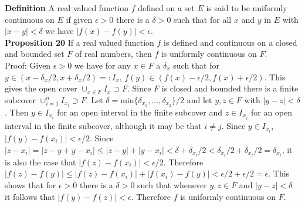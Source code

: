\documentclass[a4paper]{article}
\begin{document}
{\bf Definition} A real valued function $f$ defined on a set $E$ is said to be uniformly continuous on $E$ if given $\epsilon > 0$ there is a $\delta > 0$ such that for all $x$ and $y$ in $E$ with $|x-y| < \delta$ we have $|f(x) - f(y)| < \epsilon$. \\

{\bf Proposition 20} If a real valued function $f$ is defined and continuous on a closed and bounded set $F$ of real numbers, then $f$ is uniformly continuous on $F$. \\

Proof: Given $\epsilon > 0$ we have for any $x \in F$ a $\delta_x$ such that for $y \in (x-\delta_x/2,x+\delta_x/2) =: I_x$, $f(y) \in (f(x) - \epsilon/2, f(x) + \epsilon/2)$. This gives the open cover $\cup_{x \in F} I_x \supset F$. Since $F$ is closed and bounded there is a finite subcover $\cup_{i=1}^n I_{x_i} \supset F$. Let $\delta = \text{min}\{\delta_{x_1}, ..., \delta_{x_2}\} / 2$ and let $y,z \in F$ with $|y-z| < \delta$. Then $y \in I_{x_i}$ for an open interval in the finite subcover and $z \in I_{x_j}$ for an open interval in the finite subcover, although it may be that $i \neq j$. Since $y \in I_{x_i}$, $|f(y) - f(x_i)| < \epsilon/2$. Since $|z-x_i| = |z - y + y - x_i| \leq |z-y| +|y-x_i| < \delta + \delta_{x_i}/2< \delta_{x_i}/2 + \delta_{x_i}/2 = \delta_{x_i}$, it is also the case that $|f(z) - f(x_i)| < \epsilon/2$. Therefore $|f(z) - f(y)| \leq |f(z) - f(x_i)| + |f(x_i) - f(y)| < \epsilon/2 + \epsilon/2 = \epsilon$. This shows that for $\epsilon > 0$ there is a $\delta>0$ such that whenever $y,z \in F$ and $|y-z| < \delta$ it follows that $|f(y) - f(z)| < \epsilon$. Therefore $f$ is uniformly continuous on $F$. \\
\end{document}
